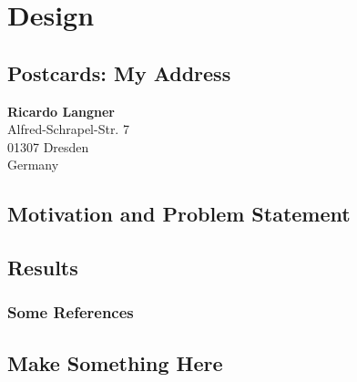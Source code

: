 %
\chapter{Design}
\label{sec:design}


\Blindtext[2][2]

\section{Postcards: My Address}
\label{sec:design:address}

\textbf{Ricardo Langner} \\
Alfred-Schrapel-Str. 7 \\
01307 Dresden \\
Germany


\section{Motivation and Problem Statement}
\label{sec:design:motivation}

\Blindtext[3][1]

\section{Results}
\label{sec:design:results}

\Blindtext[1][2]

\subsection{Some References}
\label{sec:design:results:refs}

\section{Make Something Here}
\label{sec:design:CHANGEME}
